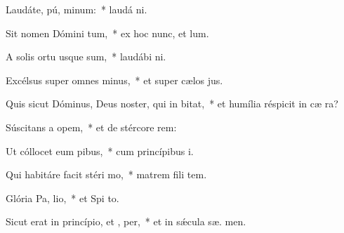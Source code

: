 \item Laudáte, pú, minum:~* laudá  ni.
\item Sit nomen Dómini tum,~* ex hoc nunc, et   lum.
\item A solis ortu usque  sum,~* laudábi  ni.
\item Excélsus super omnes  minus,~* et super cælos  jus.
\item Quis sicut Dóminus, Deus noster, qui in  bitat,~* et humília réspicit in cæ   ra?
\item Súscitans a  opem,~* et de stércore  rem:
\item Ut cóllocet eum  pibus,~* cum princípibus  i.
\item Qui habitáre facit stéri  mo,~* matrem fili tem.
\item Glória Pa,  lio,~* et Spi to.
\item Sicut erat in princípio, et ,  per,~* et in sǽcula sæ. men.
